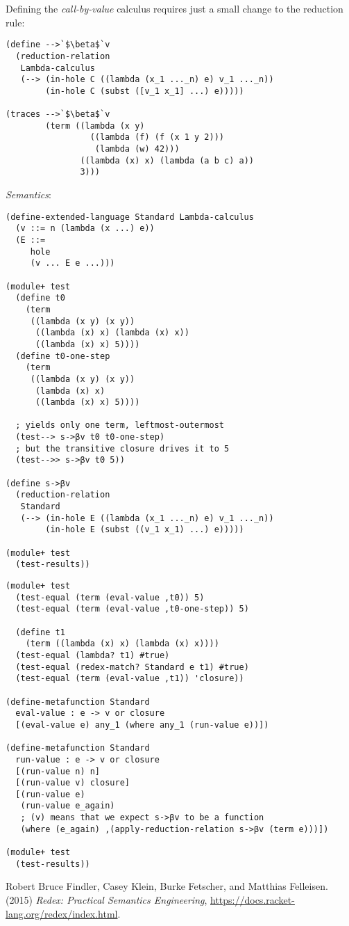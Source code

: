 Defining the \textit{call-by-value} calculus requires just a small change to the
reduction rule:

\begin{lstlisting}[frame=none,numbers=none]
(define -->`$\beta$`v
  (reduction-relation
   Lambda-calculus
   (--> (in-hole C ((lambda (x_1 ..._n) e) v_1 ..._n))
        (in-hole C (subst ([v_1 x_1] ...) e)))))

(traces -->`$\beta$`v
        (term ((lambda (x y)
                 ((lambda (f) (f (x 1 y 2)))
                  (lambda (w) 42)))
               ((lambda (x) x) (lambda (a b c) a))
               3)))
\end{lstlisting}

\textit{Semantics}:

\begin{lstlisting}[frame=none,numbers=none]
(define-extended-language Standard Lambda-calculus
  (v ::= n (lambda (x ...) e))
  (E ::=
     hole
     (v ... E e ...)))

(module+ test
  (define t0
    (term
     ((lambda (x y) (x y))
      ((lambda (x) x) (lambda (x) x))
      ((lambda (x) x) 5))))
  (define t0-one-step
    (term
     ((lambda (x y) (x y))
      (lambda (x) x)
      ((lambda (x) x) 5))))

  ; yields only one term, leftmost-outermost
  (test--> s->βv t0 t0-one-step)
  ; but the transitive closure drives it to 5
  (test-->> s->βv t0 5))

(define s->βv
  (reduction-relation
   Standard
   (--> (in-hole E ((lambda (x_1 ..._n) e) v_1 ..._n))
        (in-hole E (subst ((v_1 x_1) ...) e)))))

(module+ test
  (test-results))
\end{lstlisting}

\begin{lstlisting}[frame=none,numbers=none]
(module+ test
  (test-equal (term (eval-value ,t0)) 5)
  (test-equal (term (eval-value ,t0-one-step)) 5)

  (define t1
    (term ((lambda (x) x) (lambda (x) x))))
  (test-equal (lambda? t1) #true)
  (test-equal (redex-match? Standard e t1) #true)
  (test-equal (term (eval-value ,t1)) 'closure))

(define-metafunction Standard
  eval-value : e -> v or closure
  [(eval-value e) any_1 (where any_1 (run-value e))])

(define-metafunction Standard
  run-value : e -> v or closure
  [(run-value n) n]
  [(run-value v) closure]
  [(run-value e)
   (run-value e_again)
   ; (v) means that we expect s->βv to be a function
   (where (e_again) ,(apply-reduction-relation s->βv (term e)))])

(module+ test
  (test-results))
\end{lstlisting}

\begin{thebibliography}{9}
Robert Bruce Findler, Casey Klein, Burke Fetscher, and Matthias Felleisen.
(2015) \emph{Redex: Practical Semantics Engineering},
\url{https://docs.racket-lang.org/redex/index.html}.
\end{thebibliography}
